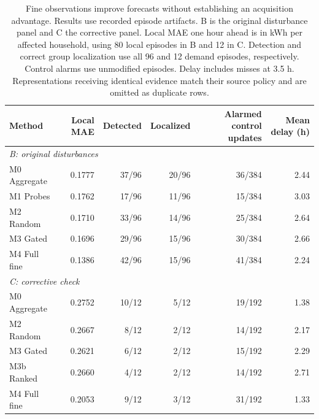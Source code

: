 \documentclass{article}
\begin{document}
\begin{table}[!t]
\caption{Fine observations improve forecasts without establishing an acquisition advantage. Results use recorded episode artifacts. B is the original disturbance panel and C the corrective panel. Local MAE one hour ahead is in kWh per affected household, using 80 local episodes in B and 12 in C. Detection and correct group localization use all 96 and 12 demand episodes, respectively. Control alarms use unmodified episodes. Delay includes misses at 3.5 h. Representations receiving identical evidence match their source policy and are omitted as duplicate rows.}
\label{tab:results}\centering
\begin{tabular}{lrrrrr}\toprule
Method & Local MAE & Detected & Localized & Alarmed control updates & Mean delay (h)\\\midrule
\multicolumn{6}{l}{\textit{B: original disturbances}} \\
M0 Aggregate & 0.1777 & 37/96 & 20/96 & 36/384 & 2.44 \\
M1 Probes & 0.1762 & 17/96 & 11/96 & 15/384 & 3.03 \\
M2 Random & 0.1710 & 33/96 & 14/96 & 25/384 & 2.64 \\
M3 Gated & 0.1696 & 29/96 & 15/96 & 30/384 & 2.66 \\
M4 Full fine & 0.1386 & 42/96 & 15/96 & 41/384 & 2.24 \\
\multicolumn{6}{l}{\textit{C: corrective check}} \\
M0 Aggregate & 0.2752 & 10/12 & 5/12 & 19/192 & 1.38 \\
M2 Random & 0.2667 & 8/12 & 2/12 & 14/192 & 2.17 \\
M3 Gated & 0.2621 & 6/12 & 2/12 & 15/192 & 2.29 \\
M3b Ranked & 0.2660 & 4/12 & 2/12 & 14/192 & 2.71 \\
M4 Full fine & 0.2053 & 9/12 & 3/12 & 31/192 & 1.33 \\
\bottomrule\end{tabular}

\end{table}
\end{document}
